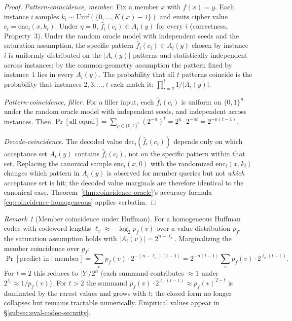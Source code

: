 \documentclass[11pt]{article}
\theoremstyle{definition}
\theoremstyle{plain}
\theoremstyle{remark}
\newtheorem{remark}{Remark}[section]
\newcommand{\fhat}{\hat{f}}
\newcommand{\enc}{\mathrm{enc}}
\newcommand{\dec}{\mathrm{dec}}
\newcommand{\B}{\{0,1\}}
\begin{document}
\begin{proof}
\emph{Pattern-coincidence, member.}
Fix a member $x$ with $f(x) = y$.  Each instance $i$ samples
$k_i \sim \mathrm{Unif}(\{0, \ldots, K(x) - 1\})$ and emits cipher
value $c_i = \enc_i(x, k_i)$.  Under $\eta = 0$, $\fhat_i(c_i) \in
A_i(y)$ for every $i$ (correctness, Property~3).  Under the random
oracle model with independent seeds and the saturation assumption,
the specific pattern $\fhat_i(c_i) \in A_i(y)$ chosen by instance
$i$ is uniformly distributed on the $|A_i(y)|$ patterns and
statistically independent across instances; by the common-geometry
assumption the pattern fixed by instance~$1$ lies in every $A_i(y)$.
The probability that all $t$ patterns coincide is the probability that
instances $2, 3, \ldots, t$ each match it: $\prod_{i=2}^{t} 1/|A_i(y)|$.

\emph{Pattern-coincidence, filler.}
For a filler input, each $\fhat_i(c_i)$ is uniform on $\B^n$ under
the random oracle model with independent seeds, and independent
across instances.  Then $\Pr[\text{all equal}] = \sum_{p \in \B^n}
(2^{-n})^t = 2^{n} \cdot 2^{-nt} = 2^{-n(t-1)}$.

\emph{Decode-coincidence.}
The decoded value $\dec_i(\fhat_i(c_i))$ depends only on which
acceptance set $A_i(y)$ contains $\fhat_i(c_i)$, not on the specific
pattern within that set.  Replacing the canonical sample
$\enc_i(x, 0)$ with the randomized $\enc_i(x, k_i)$ changes which
pattern in $A_i(y)$ is observed for member queries but not
\emph{which} acceptance set is hit; the decoded value marginals
are therefore identical to the canonical case.
Theorem~\ref{thm:coincidence-oracle}'s accuracy formula
\eqref{eq:coincidence-homogeneous} applies verbatim.
\end{proof}

\begin{remark}[Member coincidence under Huffman]
\label{rem:huffman-member-coincidence}
For a homogeneous Huffman codec with codeword lengths $\ell_v
\approx -\log_2 p_f(v)$ over a value distribution $p_f$, the
saturation assumption holds with $|A_i(v)| = 2^{n - \ell_v}$.
Marginalizing the member coincidence over $p_f$:
\[
\Pr[\text{predict in} \mid \text{member}]
  = \sum_{v} p_f(v) \cdot 2^{-(n - \ell_v)(t-1)}
  = 2^{-n(t-1)} \sum_v p_f(v) \cdot 2^{\ell_v(t-1)}.
\]
For $t = 2$ this reduces to $|Y| / 2^n$ (each summand contributes
$\approx 1$ under $2^{\ell_v} \approx 1/p_f(v)$).  For $t > 2$ the
summand $p_f(v) \cdot 2^{\ell_v(t-1)} \approx p_f(v)^{2-t}$ is
dominated by the rarest values and grows with $t$; the closed form
no longer collapses but remains tractable numerically.  Empirical
values appear in \S\ref{subsec:eval-codec-security}.
\end{remark}
\end{document}
